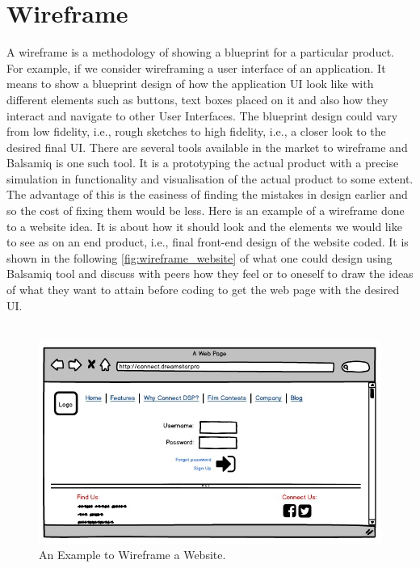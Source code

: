 \section{Wireframe}

A wireframe is a methodology of showing a blueprint for a particular product. For example, if we consider wireframing a user interface of an application. It means to show a blueprint design of how the application UI look like with different elements such as buttons, text boxes placed on it and also how they interact and navigate to other User Interfaces. The blueprint design could vary from low fidelity, i.e., rough sketches to high fidelity, i.e., a closer look to the desired final UI. There are several tools available in the market to wireframe and Balsamiq \cite{B} is one such tool. It is a prototyping the actual product with a precise simulation in functionality and visualisation of the actual product to some extent. The advantage of this is the easiness of finding the mistakes in design earlier and so the cost of fixing them would be less. Here is an example of a wireframe done to a website idea. It is about how it should look and the elements we would like to see as on an end product, i.e., final front-end design of the website coded. It is shown in the following \autoref{fig:wireframe_website} of what one could design using Balsamiq tool and discuss with peers how they feel or to oneself to draw the ideas of what they want to attain before coding to get the web page with the desired UI. \\ \\


\begin{figure}[hbt!]
	\centering
	\includegraphics[width=\linewidth]{figures/Connect_DSP}
	\caption{An Example to Wireframe a Website.\cite{B}}
	\label{fig:wireframe_website}
\end{figure}

